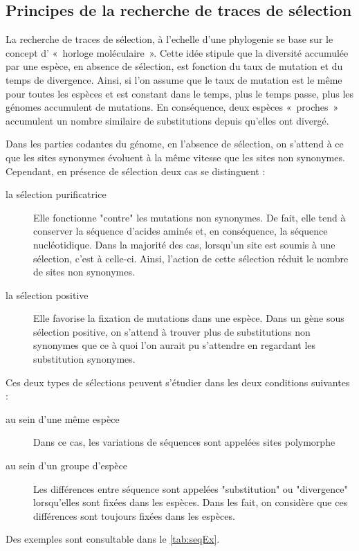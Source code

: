 \documentclass[../main]{subfiles} %
\begin{document}
\subsection{Principes de la recherche de traces de sélection}
\label{PrincipeTrace}
La recherche de traces de sélection, à l'echelle d'une \gls{phylogenie} se base sur le concept d’ « horloge moléculaire ». Cette idée stipule que la diversité accumulée par une espèce, en absence de sélection, est fonction du taux de mutation et du temps de divergence. Ainsi, si l'on assume que le taux de mutation est le même pour toutes les espèces et est constant dans le temps, plus le temps passe, plus les génomes accumulent de mutations. En conséquence, deux espèces « proches » accumulent un nombre similaire de \glspl{substitution} depuis qu'elles ont divergé.

Dans les parties codantes du génome, en l'absence de sélection, on s'attend à ce que les sites \glspl{synonyme} évoluent à la même vitesse que les sites non \glspl{synonyme}. Cependant, en présence de sélection deux cas se distinguent :
\begin{description}

    \item [la sélection purificatrice] Elle fonctionne "contre" les mutations non \glspl{synonyme}. De fait, elle tend à conserver la séquence d'acides aminés et, en conséquence, la séquence nucléotidique. Dans la majorité des cas, lorsqu'un site est soumis à une sélection, c'est à celle-ci. Ainsi, l'action de cette sélection réduit le nombre de sites non \glspl{synonyme}.

    \item [la sélection positive] Elle favorise la fixation de mutations dans une espèce. Dans un gène sous sélection positive, on s'attend à trouver plus de substitutions non \glspl{synonyme} que ce à quoi l'on aurait pu s'attendre en regardant les substitution \glspl{synonyme}.
    
\end{description}

Ces deux types de sélections peuvent s'étudier dans les deux conditions suivantes :
\begin{description}
    \item [au sein d’une même espèce] Dans ce cas, les variations de séquences sont appelées sites polymorphe
    \item [au sein d'un groupe d'espèce] Les différences entre séquence sont appelées "\gls{substitution}" ou "divergence" lorsqu'elles sont fixées dans les espèces. Dans les fait, on  considère que ces différences sont toujours fixées dans les espèces.
\end{description}
Des exemples sont consultable dans le \cref{tab:seqEx}.
\end{document}
